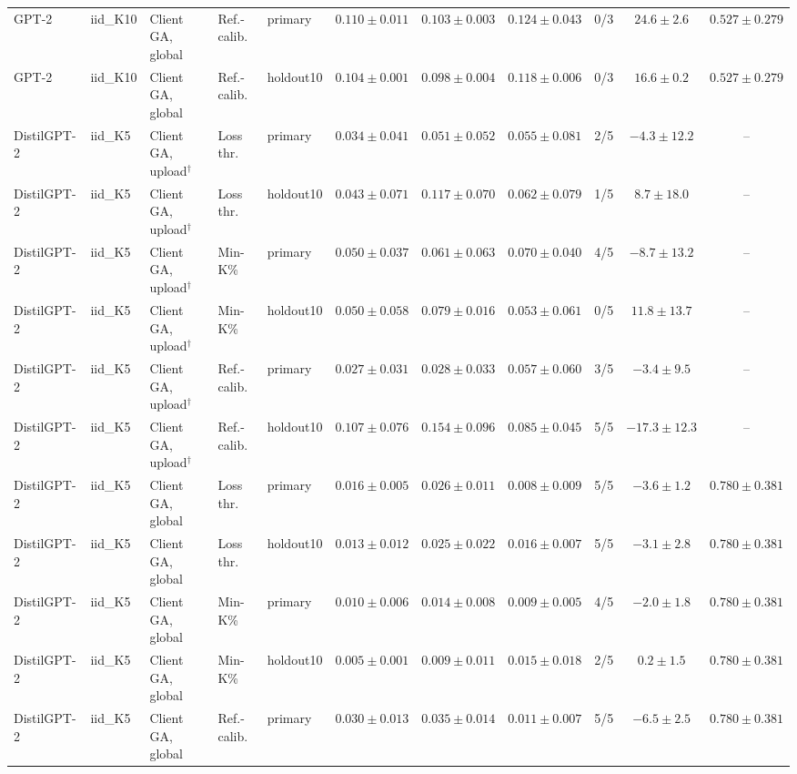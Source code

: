 \begin{table}[t]
\begin{tabular*}{\textwidth}{@{\extracolsep{\fill}}lllllcccccc@{}}
GPT-2 & iid\_K10 & Client GA, global & Ref.-calib. & primary & $0.110 \pm 0.011$ & $0.103 \pm 0.003$ & $0.124 \pm 0.043$ & 0/3 & $24.6 \pm 2.6$ & $0.527 \pm 0.279$ \\
GPT-2 & iid\_K10 & Client GA, global & Ref.-calib. & holdout10 & $0.104 \pm 0.001$ & $0.098 \pm 0.004$ & $0.118 \pm 0.006$ & 0/3 & $16.6 \pm 0.2$ & $0.527 \pm 0.279$ \\
DistilGPT-2 & iid\_K5 & Client GA, upload$^{\dagger}$ & Loss thr. & primary & $0.034 \pm 0.041$ & $0.051 \pm 0.052$ & $0.055 \pm 0.081$ & 2/5 & $-4.3 \pm 12.2$ & -- \\
DistilGPT-2 & iid\_K5 & Client GA, upload$^{\dagger}$ & Loss thr. & holdout10 & $0.043 \pm 0.071$ & $0.117 \pm 0.070$ & $0.062 \pm 0.079$ & 1/5 & $8.7 \pm 18.0$ & -- \\
DistilGPT-2 & iid\_K5 & Client GA, upload$^{\dagger}$ & Min-K\% & primary & $0.050 \pm 0.037$ & $0.061 \pm 0.063$ & $0.070 \pm 0.040$ & 4/5 & $-8.7 \pm 13.2$ & -- \\
DistilGPT-2 & iid\_K5 & Client GA, upload$^{\dagger}$ & Min-K\% & holdout10 & $0.050 \pm 0.058$ & $0.079 \pm 0.016$ & $0.053 \pm 0.061$ & 0/5 & $11.8 \pm 13.7$ & -- \\
DistilGPT-2 & iid\_K5 & Client GA, upload$^{\dagger}$ & Ref.-calib. & primary & $0.027 \pm 0.031$ & $0.028 \pm 0.033$ & $0.057 \pm 0.060$ & 3/5 & $-3.4 \pm 9.5$ & -- \\
DistilGPT-2 & iid\_K5 & Client GA, upload$^{\dagger}$ & Ref.-calib. & holdout10 & $0.107 \pm 0.076$ & $0.154 \pm 0.096$ & $0.085 \pm 0.045$ & 5/5 & $-17.3 \pm 12.3$ & -- \\
DistilGPT-2 & iid\_K5 & Client GA, global & Loss thr. & primary & $0.016 \pm 0.005$ & $0.026 \pm 0.011$ & $0.008 \pm 0.009$ & 5/5 & $-3.6 \pm 1.2$ & $0.780 \pm 0.381$ \\
DistilGPT-2 & iid\_K5 & Client GA, global & Loss thr. & holdout10 & $0.013 \pm 0.012$ & $0.025 \pm 0.022$ & $0.016 \pm 0.007$ & 5/5 & $-3.1 \pm 2.8$ & $0.780 \pm 0.381$ \\
DistilGPT-2 & iid\_K5 & Client GA, global & Min-K\% & primary & $0.010 \pm 0.006$ & $0.014 \pm 0.008$ & $0.009 \pm 0.005$ & 4/5 & $-2.0 \pm 1.8$ & $0.780 \pm 0.381$ \\
DistilGPT-2 & iid\_K5 & Client GA, global & Min-K\% & holdout10 & $0.005 \pm 0.001$ & $0.009 \pm 0.011$ & $0.015 \pm 0.018$ & 2/5 & $0.2 \pm 1.5$ & $0.780 \pm 0.381$ \\
DistilGPT-2 & iid\_K5 & Client GA, global & Ref.-calib. & primary & $0.030 \pm 0.013$ & $0.035 \pm 0.014$ & $0.011 \pm 0.007$ & 5/5 & $-6.5 \pm 2.5$ & $0.780 \pm 0.381$ \\

\end{tabular*}
\end{table}
